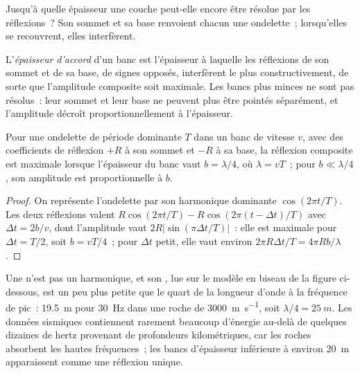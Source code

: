 Jusqu'à quelle épaisseur une couche peut-elle encore être résolue par les réflexions~? Son sommet et sa base
renvoient chacun une ondelette~; lorsqu'elles se recouvrent, elles interfèrent.

\begin{definition}\label{def:b3:exploration-seismology:resolution}
L'\emph{épaisseur d'accord} d'un banc est l'épaisseur
à laquelle les réflexions de son sommet et de sa base, de signes opposés, interfèrent
le plus constructivement, de sorte que l'amplitude composite soit maximale. Les bancs plus minces
ne sont pas résolus~: leur sommet et leur base ne peuvent plus être pointés séparément, et
l'amplitude décroît proportionnellement à l'épaisseur.
\end{definition}

\begin{proposition}\label{prop:b3:exploration-seismology:tuning}
Pour une ondelette de période dominante $T$ dans un banc de vitesse $v$, avec des coefficients de réflexion
$+R$ à son sommet et $-R$ à sa base, la réflexion composite est
maximale lorsque l'épaisseur du banc vaut $b = \lambda/4$, où $\lambda = vT$~; pour
$b \ll \lambda/4$, son amplitude est proportionnelle à $b$.
\end{proposition}

\begin{proof}
On représente l'ondelette par son harmonique dominante $\cos(2\pi t/T)$. Les deux
réflexions valent $R\cos(2\pi t/T) - R\cos(2\pi(t - \Delta t)/T)$ avec
$\Delta t = 2b/v$, dont l'amplitude vaut $2R|\sin(\pi\Delta t/T)|$~: elle est maximale pour
$\Delta t = T/2$, soit $b = vT/4$~; pour $\Delta t$ petit, elle vaut environ
$2\pi R\Delta t/T = 4\pi Rb/\lambda$.
\end{proof}

Une  n'est pas un harmonique, et son , lue sur le modèle en biseau de la figure ci-dessous,
est un peu plus petite que le quart de la longueur d'onde
à la fréquence de pic~: \qty{19.5}{m} pour \qty{30}{Hz} dans une roche de
\qty{3000}{m.s^{-1}}, soit $\lambda/4 = \qty{25}{m}$. Les données sismiques contiennent rarement
beaucoup d'énergie au-delà de quelques dizaines de hertz provenant de profondeurs kilométriques, car les
roches absorbent les hautes fréquences~; les bancs d'épaisseur inférieure à environ \qty{20}{m} apparaissent
comme une réflexion unique.

